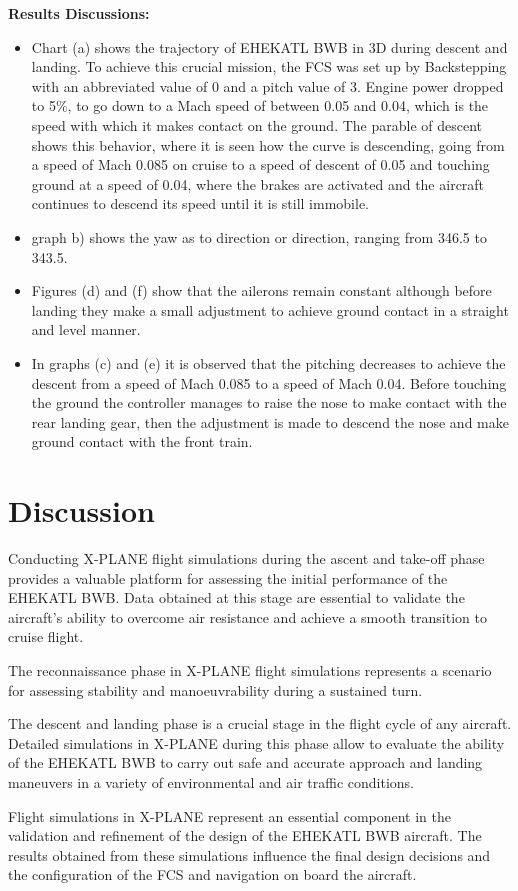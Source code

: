 \textbf{Results Discussions:}
\begin{itemize}
    \item Chart (a) shows the trajectory of EHEKATL BWB in 3D during descent and landing. To achieve this crucial mission, the FCS was set up by Backstepping with an abbreviated value of 0 and a pitch value of 3. Engine power dropped to 5$\%$, to go down to a Mach speed of between 0.05 and 0.04, which is the speed with which it makes contact on the ground. The parable of descent shows this behavior, where it is seen how the curve is descending, going from a speed of Mach 0.085 on cruise to a speed of descent of 0.05 and touching ground at a speed of 0.04, where the brakes are activated and the aircraft continues to descend its speed until it is still immobile. 
    \item graph b) shows the yaw as to direction or direction, ranging from 346.5 to 343.5.
    \item Figures (d) and (f) show that the ailerons remain constant although before landing they make a small adjustment to achieve ground contact in a straight and level manner. 
    \item In graphs (c) and (e) it is observed that the pitching decreases to achieve the descent from a speed of Mach 0.085 to a speed of Mach 0.04. Before touching the ground the controller manages to raise the nose to make contact with the rear landing gear, then the adjustment is made to descend the nose and make ground contact with the front train.
\end{itemize}

\section{Discussion}  

Conducting X-PLANE flight simulations during the ascent and take-off phase provides a valuable platform for assessing the initial performance of the EHEKATL BWB. Data obtained at this stage are essential to validate the aircraft’s ability to overcome air resistance and achieve a smooth transition to cruise flight.

The reconnaissance phase in X-PLANE flight simulations represents a scenario for assessing stability and manoeuvrability during a sustained turn. 

The descent and landing phase is a crucial stage in the flight cycle of any aircraft. Detailed simulations in X-PLANE during this phase allow to evaluate the ability of the EHEKATL BWB to carry out safe and accurate approach and landing maneuvers in a variety of environmental and air traffic conditions.

Flight simulations in X-PLANE represent an essential component in the validation and refinement of the design of the EHEKATL BWB aircraft. The results obtained from these simulations influence the final design decisions and the configuration of the FCS and navigation on board the aircraft.










